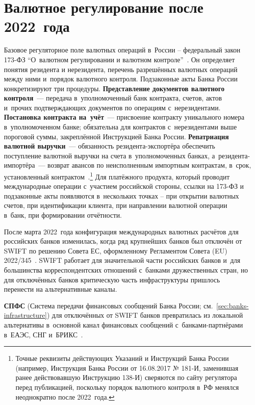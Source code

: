 \section{Валютное регулирование после 2022~года}\label{sec:mc-russia}

Базовое регуляторное поле валютных операций в~России --
федеральный закон 173-ФЗ \enquote{О~валютном регулировании
и валютном контроле}~\cite{fz-173}. Он определяет понятия
резидента и нерезидента, перечень разрешённых валютных
операций между ними и~порядок валютного контроля. Подзаконные
акты Банка России конкретизируют три процедуры. \textbf{Представление
документов валютного контроля}~--- передача в~уполномоченный банк
контракта, счетов, актов и~прочих подтверждающих документов по
операциям с~нерезидентами. \textbf{Постановка контракта на~учёт}~---
присвоение контракту уникального номера в~уполномоченном банке;
обязательна для контрактов с~нерезидентами выше пороговой суммы,
закреплённой Инструкцией Банка России. \textbf{Репатриация валютной
выручки}~--- обязанность резидента-экспортёра обеспечить поступление
валютной выручки на счета в~уполномоченных банках, а~резидента-импортёра~---
возврат авансов по неисполненным импортным контрактам, в~срок,
установленный контрактом~\cite{cbr-181i}.\footnote{Точные реквизиты
действующих Указаний и Инструкций Банка России (например,
Инструкция Банка России от 16.08.2017 № 181-И, заменившая ранее действовавшую Инструкцию 138-И)
сверяются по сайту регулятора перед публикацией, поскольку
порядок валютного контроля в~РФ менялся неоднократно после 2022~года.}
Для платёжного продукта, который проводит международные
операции с~участием российской стороны, ссылки на 173-ФЗ
и подзаконные акты появляются в~нескольких точках -- при
открытии валютных счетов, при идентификации клиента, при
направлении валютной операции в~банк, при формировании
отчётности.

После марта 2022~года конфигурация международных валютных
расчётов для российских банков изменилась, когда ряд
крупнейших банков был отключён от SWIFT по решению Совета ЕС,
оформленному Регламентом Совета (EU) 2022/345~\cite{eu-swift-russia-2022,ofac-russia-sanctions}.
SWIFT работает для значительной части российских банков
и~для большинства корреспондентских отношений с~банками
дружественных стран, но для отключённых банков критическую
часть инфраструктуры пришлось перенести на альтернативные каналы.

\textbf{СПФС} (Система передачи финансовых сообщений Банка
России; см.~\autoref{sec:banks-infrastructure}) для отключённых
от SWIFT банков превратилась из локальной альтернативы в~основной
канал финансовых сообщений с~банками-партнёрами в~ЕАЭС, СНГ
и~БРИКС~\cite{cbr-spfs}.

